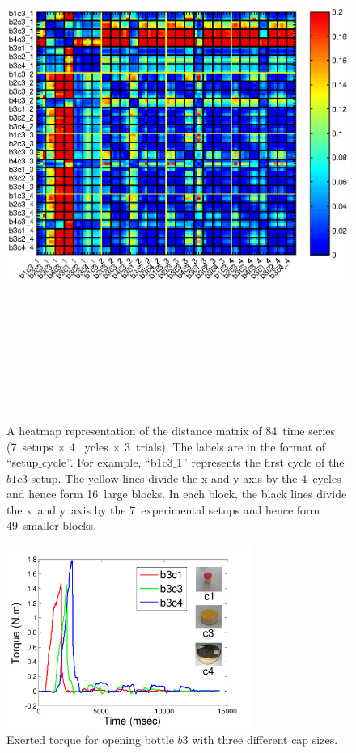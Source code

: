 \begin{figure}
\label{heatmap}
  \centering
  \includegraphics[width=18cm,height=18cm]{./fig/heatmap_all6_3.eps}
  \caption{ \scriptsize{A heatmap representation of the distance
      matrix of 84~time series (7~setups $\times$ 4 ~ycles $\times$
      3~trials). The labels are in the format of
      ``setup$\_$cycle''. For example, ``b1c3$\_$1'' represents the
      first cycle of the $b1c3$ setup. The yellow lines divide the x
      and y axis by the 4~cycles and hence form 16~large blocks. In
      each block, the black lines divide the x~and y~axis by the
      7~experimental setups and hence form 49~smaller blocks. }  }
\label{fig:heatmap}
\end{figure}

\begin{figure}
    \centering
    \includegraphics[width=8cm]{./fig/c1c3c4_time_T.pdf}
    \caption{ \scriptsize{Exerted torque for opening bottle $b3$ with three different cap sizes.}
}
\label{fig:cappatterns}
\end{figure}

